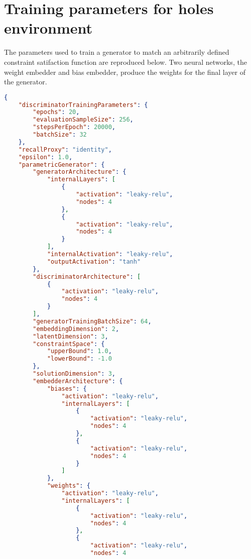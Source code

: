 \documentclass[../main.tex]{subfiles}
\begin{document}
\section{Training parameters for holes environment} \label{appendix:holesTrainingParameters}

The parameters used to train a generator to match an arbitrarily defined constraint satifaction function are reproduced below.
Two neural networks, the weight embedder and bias embedder, produce the weights for the final layer of the generator.

\begin{lstlisting}[language=json,firstnumber=1,caption={Experimental parameters for training a generator on the holes environment.},captionpos=b]
{  
    "discriminatorTrainingParameters": {  
        "epochs": 20,
        "evaluationSampleSize": 256,
        "stepsPerEpoch": 20000,
        "batchSize": 32
    },
    "recallProxy": "identity",
    "epsilon": 1.0,
    "parametricGenerator": {  
        "generatorArchitecture": {  
            "internalLayers": [  
                {  
                    "activation": "leaky-relu",
                    "nodes": 4
                },
                {  
                    "activation": "leaky-relu",
                    "nodes": 4
                }
            ],
            "internalActivation": "leaky-relu",
            "outputActivation": "tanh"
        },
        "discriminatorArchitecture": [  
            {  
                "activation": "leaky-relu",
                "nodes": 4
            }
        ],
        "generatorTrainingBatchSize": 64,
        "embeddingDimension": 2,
        "latentDimension": 3,
        "constraintSpace": {  
            "upperBound": 1.0,
            "lowerBound": -1.0
        },
        "solutionDimension": 3,
        "embedderArchitecture": {  
            "biases": {  
                "activation": "leaky-relu",
                "internalLayers": [  
                    {  
                        "activation": "leaky-relu",
                        "nodes": 4
                    },
                    {  
                        "activation": "leaky-relu",
                        "nodes": 4
                    }
                ]
            },
            "weights": {  
                "activation": "leaky-relu",
                "internalLayers": [  
                    {  
                        "activation": "leaky-relu",
                        "nodes": 4
                    },
                    {  
                        "activation": "leaky-relu",
                        "nodes": 4

\end{lstlisting}
\end{document}
